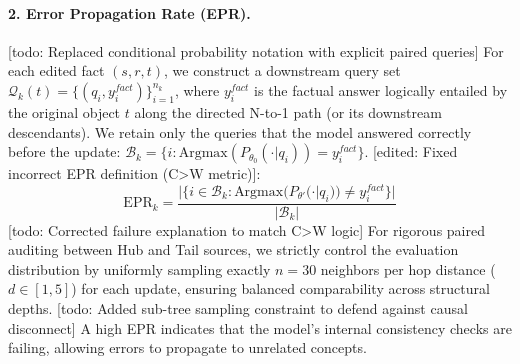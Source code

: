 \paragraph{2. Error Propagation Rate (EPR).}
[todo: Replaced conditional probability notation with explicit paired queries] For each edited fact $(s,r,t)$, we construct a downstream query set $\mathcal{Q}_k(t)=\{(q_i, y_i^{fact})\}_{i=1}^{n_k}$, where $y_i^{fact}$ is the factual answer logically entailed by the original object $t$ along the directed N-to-1 path (or its downstream descendants).
We retain only the queries that the model answered correctly before the update: $\mathcal{B}_k=\{i: \text{Argmax}(P_{\theta_0}(\cdot | q_i))=y_i^{fact}\}$. [edited: Fixed incorrect EPR definition (C>W metric)]:
\begin{equation}
    \text{EPR}_k = \frac{|\{i\in \mathcal{B}_k: \text{Argmax}(P_{\theta'}(\cdot | q_i))\not= y_i^{fact}\}|}{|\mathcal{B}_k|}
    \label{eq:epr}
\end{equation}
[todo: Corrected failure explanation to match C>W logic]
For rigorous paired auditing between Hub and Tail sources, we strictly control the evaluation distribution by uniformly sampling exactly $n=30$ neighbors per hop distance ($d \in [1, 5]$) for each update, ensuring balanced comparability across structural depths. [todo: Added sub-tree sampling constraint to defend against causal disconnect] A high EPR indicates that the model's internal consistency checks are failing, allowing errors to propagate to unrelated concepts.

